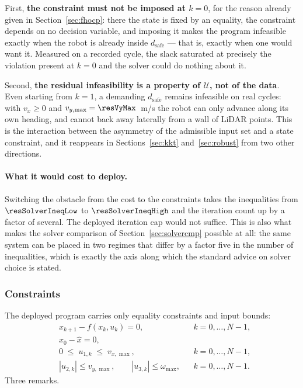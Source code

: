 \documentclass[11pt,a4paper]{article}
\newcommand{\dsafe}{d_{\mathrm{safe}}}
\begin{document}
First, \textbf{the constraint must not be imposed at $k=0$}, for the reason already given in
Section~\ref{sec:fhocp}: there the state is fixed by an equality, the constraint depends on no decision
variable, and imposing it makes the program infeasible exactly when the robot is already inside $\dsafe$ ---
that is, exactly when one would want it. Measured on a recorded cycle, the slack saturated at precisely the
violation present at $k=0$ and the solver could do nothing about it.

Second, \textbf{the residual infeasibility is a property of $\mathcal{U}$, not of the data}. Even starting
from $k=1$, a demanding $\dsafe$ remains infeasible on real cycles: with $v_x\ge0$ and
$v_{y,\max}=\resVyMax$~m/s the robot can only advance along its own heading, and cannot back away laterally
from a wall of LiDAR points. This is the interaction between the asymmetry of the admissible input set and a
state constraint, and it reappears in Sections~\ref{sec:kkt} and~\ref{sec:robust} from two other directions.

\paragraph{What it would cost to deploy.} Switching the obstacle from the cost to the constraints takes the
inequalities from $\resSolverIneqLow$ to $\resSolverIneqHigh$ and the iteration count up by a factor of
several. The deployed iteration cap would not suffice. This is also what makes the solver comparison of
Section~\ref{sec:solvercmp} possible at all: the same system can be placed in two regimes that differ by a
factor five in the number of inequalities, which is exactly the axis along which the standard advice on
solver choice is stated.

\subsubsection{Constraints}
\label{sec:constraints}

The deployed program carries only equality constraints and input bounds:
\begin{subequations}
\label{eq:cons}
\begin{align}
  & x_{k+1}-f(x_k,u_k)=0, && k=0,\dots,N-1, \label{eq:cons-dyn}\\
  & x_0-\hat x=0, \label{eq:cons-init}\\
  & 0\;\le\;u_{1,k}\;\le\;v_{x,\max}, && k=0,\dots,N-1, \label{eq:cons-vx}\\
  & |u_{2,k}|\le v_{y,\max},\qquad |u_{3,k}|\le\omega_{\max}, && k=0,\dots,N-1. \label{eq:cons-vyw}
\end{align}
\end{subequations}
Three remarks.
\end{document}

